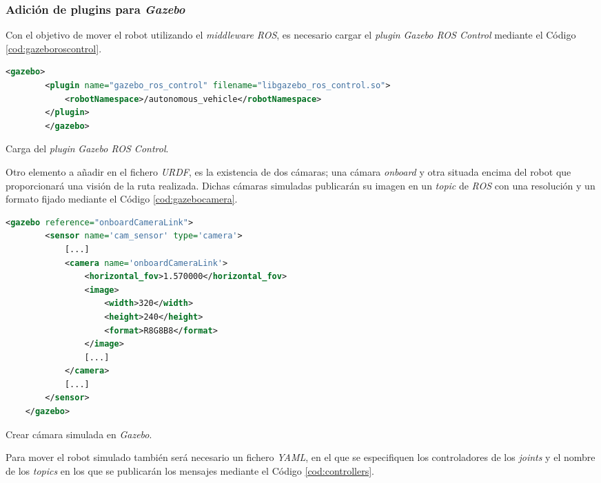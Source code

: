 \subsubsection{Adición de plugins para \textit{Gazebo}}

Con el objetivo de mover el robot utilizando el \textit{middleware ROS}, es necesario cargar el \textit{plugin} \textit{Gazebo ROS Control} mediante el Código \ref{cod:gazeboroscontrol}.\\

\begin{code}[h]
	\begin{lstlisting}[language=XML]
		<gazebo>
		<plugin name="gazebo_ros_control" filename="libgazebo_ros_control.so">
			<robotNamespace>/autonomous_vehicle</robotNamespace>
		</plugin>
		</gazebo>
	\end{lstlisting}
	\caption[Carga del \textit{plugin} \textit{Gazebo ROS Control}.]{Carga del \textit{plugin} \textit{Gazebo ROS Control}.}
	\label{cod:gazeboroscontrol}
\end{code}

Otro elemento a añadir en el fichero \textit{URDF}, es la existencia de dos cámaras; una cámara \textit{onboard} y otra situada encima del robot que proporcionará una visión de la ruta realizada. Dichas cámaras simuladas publicarán su imagen en un \textit{topic} de \textit{ROS} con una resolución y un formato fijado mediante el Código \ref{cod:gazebocamera}.\\

\begin{code}[h]
	\begin{lstlisting}[language=XML]
	<gazebo reference="onboardCameraLink">
		<sensor name='cam_sensor' type='camera'>
			[...]
			<camera name='onboardCameraLink'>
				<horizontal_fov>1.570000</horizontal_fov>
				<image>
					<width>320</width>
					<height>240</height>
					<format>R8G8B8</format>
				</image>
				[...]
			</camera>
			[...]
		</sensor>
	</gazebo>
	\end{lstlisting}
	\caption[Crear cámara simulada en \textit{Gazebo}.]{Crear cámara simulada en \textit{Gazebo}.}
	\label{cod:gazebocamera}
\end{code}

Para mover el robot simulado también será necesario un fichero \textit{YAML}, en el que se especifiquen los controladores de los \textit{joints} y el nombre de los \textit{topics} en los que se publicarán los mensajes mediante el Código \ref{cod:controllers}.\\


